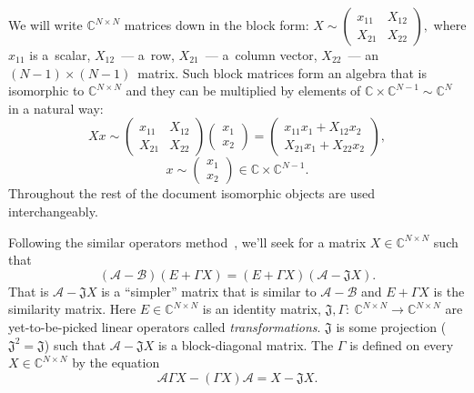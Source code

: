 We will write \( \mathbb{C}^{N\times N} \) matrices down in the block form:
\( X{\sim}
    \begin{pmatrix}
    x_{11} & X_{12} \\
    X_{21} & X_{22}
    \end{pmatrix}, \)
    where \( x_{11} \) is a~scalar,
    \( X_{12} \)~--- a~row, \( X_{21} \)~--- a~column vector,
    \( X_{22} \)~--- an \( {(N{-}1){\times}(N{-}1)} \)~matrix.
Such block matrices form an algebra that is isomorphic to \( \mathbb{C}^{N\times N} \)
and they can be multiplied by elements of \( \mathbb{C}\times\mathbb{C}^{N-1}\sim\mathbb{C}^N \)
in a natural way:
\[
    X x \sim
    \begin{pmatrix}
    x_{11} & X_{12} \\
    X_{21} & X_{22}
    \end{pmatrix}
    \begin{pmatrix} x_1 \\ x_2 \end{pmatrix}
  = \begin{pmatrix}
      x_{11} x_1 + X_{12} x_2 \\
      X_{21} x_1 + X_{22} x_2
      \end{pmatrix},
    \]
\[
      x \sim
      \begin{pmatrix} x_1 \\ x_2 \end{pmatrix}
          \in \mathbb{C}\times\mathbb{C}^{N-1}.
    \]
Throughout the rest of the document isomorphic objects
    are used interchangeably.

Following the similar operators method~\cite{baskakov-split},
    we'll seek for a matrix \( X{\in}\mathbb{C}^{N{\times}N} \) such that
\begin{equation}\label{kozlukovsv:eq:similarity}
    (\mathcal{A-B})(E+\Gamma X) =
    (E+\Gamma X)(\mathcal{A} - \mathfrak{J} X).
\end{equation}
That is \( \mathcal{A}{-}\mathfrak{J} X \) is a ``simpler'' matrix
    that is similar to \( \mathcal{A}{-}\mathcal{B} \)
    and \( E{+}\Gamma X \) is the similarity matrix.
Here \( E\in{\mathbb{C}^{N{\times}N}} \) is an identity matrix,
    \( \mathfrak{J},\Gamma{:}\ \mathbb{C}^{N{\times}N}{\to}\mathbb{C}^{N{\times}N} \)
    are yet-to-be-picked linear operators called \emph{transformations}.
\( \mathfrak{J} \) is some projection (\(\mathfrak{J}^2=\mathfrak{J}\))
    such that \( \mathcal{A} - \mathfrak{J}X \) is a block-diagonal matrix.
The \( \Gamma \) is defined on every
    \( X\in {\mathbb{C}^{N{\times}N}} \)
    by the equation
\begin{equation}\label{eq:kozlukovsv:gamma}
    \mathcal{A}\Gamma X - (\Gamma X) \mathcal{A} = X - \mathfrak{J}X.
\end{equation}

